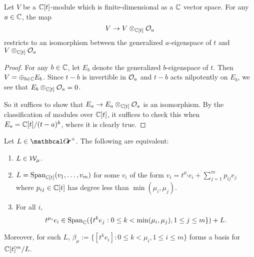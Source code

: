 \documentclass{article} %
\begin{document}
\begin{lemma} 
\label{le:linalg} %
Let $ V $ be a $ \mathbb C[t]$-module which is finite-dimensional as a $ \mathbb C$ vector space.  For any  $ a \in \mathbb C$, the map
$$ 
    V  \rightarrow V \otimes_{\mathbb C[t]} \mathcal O_a
$$
restricts to an isomorphism between the generalized $ a $-eigenspace of $ t $ and $ V \otimes_{\mathbb C[t]} \mathcal O_a$
\end{lemma}
% 
\begin{proof}
    For any $ b \in \mathbb C$, let $ E_b $ denote the generalized $b$-eigenspace of $t$.  Then $ V = \oplus_{b \in \mathbb C} E_b$.  Since $ t - b$ is invertible in $ \mathcal O_a$ and $ t -b $ acts nilpotently on $ E_b$, we see that $ E_b \otimes_{\mathbb C[t]} \mathcal O_a = 0 $.
    
    So it suffices to show that $ E_a \rightarrow E_a \otimes_{\mathbb C[t]} \mathcal O_a$ is an isomorphism.  By the classification of modules over $ \mathbb C[t]$, it suffices to check this when  $ E_a = \mathbb C[t]/(t-a)^k$, where it is clearly true.
\end{proof}
% 
\begin{lemma} 
\label{le:Wmu}
Let $ L \in \Grth^+$.  The following are equivalent:
\begin{enumerate}[label=(\roman*)]
    \item \label{it:slice} $ L \in \mathcal W_\mu$.
    \item \label{it:basis} $ L = \operatorname{Span}_{\mathbb C[t]}(v_1, \dots, v_m)$ for some $ v_i $ of the form $ v_i = t^{\mu_i} e_i + \sum_{j=1}^m p_{ij} e_j $ where $ p_{ij} \in \mathbb C[t] $ has degree less than $ \min(\mu_i, \mu_j)$.
    \item \label{it:t-act} For all $ i $, 
    $$ t^{\mu_i} e_i \in \operatorname{Span}_\mathbb C(\{t^k e_j : 0 \le k < \min(\mu_i, \mu_j), 1 \le j \le m \}) + L. $$
\end{enumerate}
Moreover, for such $L $, $ \beta_\mu := \{ [t^k e_i] : 0 \le k < \mu_i, 1 \le i \le m\}$ forms a basis for $ \mathbb C[t]^m/L$. 
\end{lemma}
% 
% 
\end{document}
